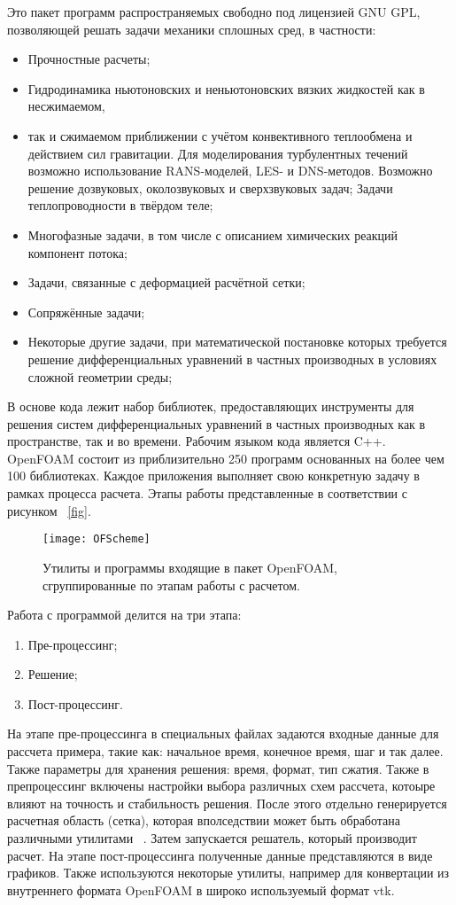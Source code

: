 \documentclass[14pt]{extreport}
\begin{document}
Это пакет программ распространяемых свободно под лицензией GNU GPL, позволяющей решать задачи механики сплошных сред, в частности: 
\begin{itemize}
\item Прочностные расчеты;
\item Гидродинамика ньютоновских и неньютоновских вязких жидкостей как в несжимаемом, \item так и сжимаемом приближении с учётом конвективного теплообмена и действием сил гравитации. Для моделирования турбулентных течений возможно использование RANS-моделей, LES- и DNS-методов. Возможно решение дозвуковых, околозвуковых и сверхзвуковых задач;
Задачи теплопроводности в твёрдом теле;
\item Многофазные задачи, в том числе с описанием химических реакций компонент потока;
\item Задачи, связанные с деформацией расчётной сетки;
\item Сопряжённые задачи;
\item Некоторые другие задачи, при математической постановке которых требуется решение дифференциальных уравнений в частных производных в условиях сложной геометрии среды;
\end{itemize}

В основе кода лежит набор библиотек, предоставляющих инструменты для решения систем дифференциальных уравнений в частных производных как в пространстве, так и во времени. Рабочим языком кода является C++. OpenFOAM состоит из приблизительно 250 программ основанных на более чем 100 библиотеках. Каждое приложения выполняет свою конкретную задачу в рамках процесса расчета. Этапы работы представленные в соответствии с рисунком ~\ref{fig}.

\begin{figure}[H]
\centerline{\texttt{[image: OFScheme]}}
\caption{Утилиты и программы входящие в пакет OpenFOAM, сгруппированные по этапам работы с расчетом.}
\label{fig1}
\end{figure}

Работа с программой делится на три этапа:
\begin{enumerate}
\item Пре-процессинг;
\item Решение;
\item Пост-процессинг.
\end{enumerate}

На этапе пре-процессинга в специальных файлах задаются входные данные для рассчета примера, такие как: начальное время, конечное время, шаг и так далее. Также параметры для хранения решения: время, формат, тип сжатия. Также в препроцессинг включены настройки выбора различных схем рассчета, котоыре влияют на точность и стабильность решения. После этого отдельно генерируется расчетная область (сетка), которая вполседствии может быть обработана различными утилитами ~\cite{OpenfoamUserGuide}. Затем запускается решатель, который производит расчет. На этапе пост-процессинга полученные данные представляются в виде графиков. Также используются некоторые утилиты, например для конвертации из внутреннего формата OpenFOAM в широко используемый формат vtk.
\end{document}
